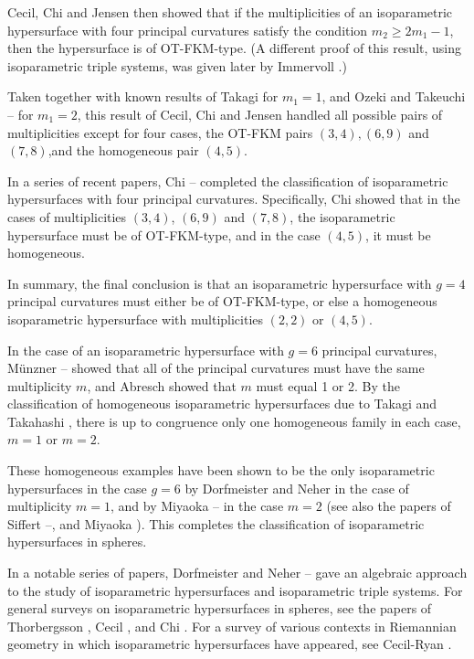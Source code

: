 \documentclass[12pt]{article}
\begin{document}
{Cecil, Chi and Jensen \cite{CCJ1} then
showed that if the multiplicities of an isoparametric hypersurface with four principal curvatures satisfy the condition
$m_2 \geq 2 m_1 - 1$, then
the hypersurface is of OT-FKM-type.  (A different proof of this result, using isoparametric 
triple systems, was given later by Immervoll \cite{Im}.)

Taken together with known results of Takagi \cite{Takagi} for $m_1 = 1$,
and Ozeki and Takeuchi \cite{OT}--\cite{OT2} for $m_1 = 2$, this result of Cecil, Chi and Jensen handled all
possible pairs of multiplicities except for four cases, the OT-FKM pairs
$(3,4), (6,9)$ and $(7,8)$,and  the homogeneous pair $(4,5)$.

In a series of recent papers, Chi \cite{Chi}--\cite{Chi4} completed the classification of isoparametric hypersurfaces with four principal curvatures.
Specifically, Chi showed that in the cases of multiplicities
$(3,4)$, $(6,9)$ and $(7,8)$, the isoparametric hypersurface must be of OT-FKM-type, and in the case $(4,5)$, it must be homogeneous.

In summary, the final conclusion is that an isoparametric hypersurface with $g=4$ principal curvatures must either be of
OT-FKM-type, or else a homogeneous isoparametric hypersurface with multiplicities $(2,2)$ or $(4,5)$.

In the case of an isoparametric hypersurface with $g=6$ principal curvatures, M\"{u}nzner \cite{Mu}--\cite{Mu2} showed
that all of the principal curvatures must have the same multiplicity $m$, and
Abresch \cite{Ab} showed that $m$ must equal 1 or 2.
By the classification of homogeneous isoparametric hypersurfaces due to Takagi and Takahashi \cite{TT},
there is up to congruence only one homogeneous family in each case, $m=1$ or $m=2$.  

These homogeneous examples have been shown to be
the only isoparametric hypersurfaces in the case $g=6$ by Dorfmeister and Neher \cite{DN5}
in the case of multiplicity $m=1$, and by Miyaoka \cite{Mi11}--\cite{Mi12} in the case $m=2$
(see also the papers of Siffert \cite{Siffert1}--\cite{Siffert2}, and Miyaoka \cite{Mi25}).
This completes the classification of isoparametric hypersurfaces in spheres.


In a notable series of papers, Dorfmeister and Neher \cite{DN1}--\cite{DN6}
gave an algebraic approach to the study of isoparametric
hypersurfaces and isoparametric triple systems. 
For general surveys on isoparametric hypersurfaces in spheres,
see the papers of Thorbergsson \cite{Th6}, Cecil \cite{Cec10}, and Chi \cite{Chi-survey}.
For a survey of various contexts in Riemannian geometry in which isoparametric hypersurfaces have appeared,
see Cecil-Ryan \cite[pp. 182--184]{CR8}. 


}
\end{document}
